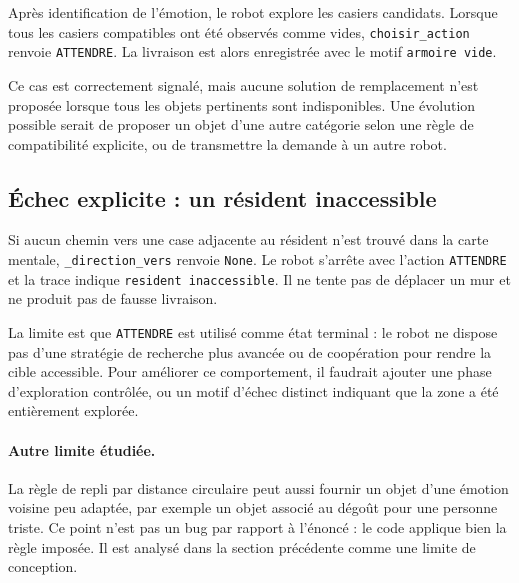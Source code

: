 \documentclass[11pt,a4paper]{article}
\begin{document}
Après identification de l'émotion, le robot explore les casiers candidats.
Lorsque tous les casiers compatibles ont été observés comme vides,
\texttt{choisir\_action} renvoie \texttt{ATTENDRE}. La livraison est alors
enregistrée avec le motif \texttt{armoire vide}.

Ce cas est correctement signalé, mais aucune solution de remplacement n'est
proposée lorsque tous les objets pertinents sont indisponibles. Une évolution
possible serait de proposer un objet d'une autre catégorie selon une règle de
compatibilité explicite, ou de transmettre la demande à un autre robot.

\subsection{Échec explicite : un résident inaccessible}

Si aucun chemin vers une case adjacente au résident n'est trouvé dans la carte
mentale, \texttt{\_direction\_vers} renvoie \texttt{None}. Le robot s'arrête
avec l'action \texttt{ATTENDRE} et la trace indique
\texttt{resident inaccessible}. Il ne tente pas de déplacer un mur et ne
produit pas de fausse livraison.

La limite est que \texttt{ATTENDRE} est utilisé comme état terminal : le robot
ne dispose pas d'une stratégie de recherche plus avancée ou de coopération
pour rendre la cible accessible. Pour améliorer ce comportement, il faudrait
ajouter une phase d'exploration contrôlée, ou un motif d'échec distinct
indiquant que la zone a été entièrement explorée.

\paragraph{Autre limite étudiée.}
La règle de repli par distance circulaire peut aussi fournir un objet d'une
émotion voisine peu adaptée, par exemple un objet associé au dégoût pour une
personne triste. Ce point n'est pas un bug par rapport à l'énoncé : le code
applique bien la règle imposée. Il est analysé dans la section précédente
comme une limite de conception.
\end{document}
